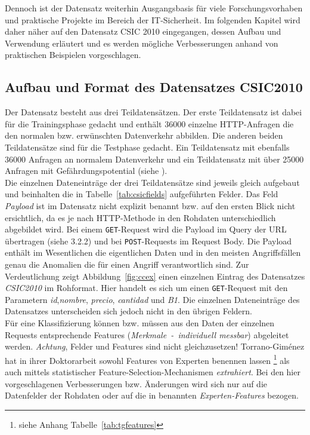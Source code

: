 Dennoch ist der Datensatz weiterhin Ausgangsbasis für viele Forschungsvorhaben und praktische Projekte im Bereich der IT-Sicherheit. Im folgenden Kapitel wird daher näher auf den Datensatz CSIC 2010 eingegangen, dessen Aufbau und Verwendung erläutert und es werden mögliche Verbesserungen anhand von praktischen Beispielen vorgeschlagen.
%

\subsection{Aufbau und Format des Datensatzes CSIC2010}
\label{sec:aufbauformat}

Der Datensatz besteht aus drei Teildatensätzen. Der erste Teildatensatz ist dabei für die Trainingsphase gedacht und enthält 36000 einzelne HTTP-Anfragen die den normalen bzw. erwünschten Datenverkehr abbilden. Die anderen beiden Teildatensätze sind für die Testphase gedacht. Ein Teildatensatz mit ebenfalls 36000 Anfragen an normalem Datenverkehr und ein Teildatensatz mit über 25000 Anfragen mit Gefährdungspotential (siehe \cite{csic2010}).\\

Die einzelnen Dateneinträge der drei Teildatensätze sind jeweils gleich aufgebaut und beinhalten die in Tabelle~\ref{tab:csicfields} aufgeführten Felder. Das Feld \emph{Payload} ist im Datensatz nicht explizit benannt bzw. auf den ersten Blick nicht ersichtlich, da es je nach HTTP-Methode in den Rohdaten unterschiedlich abgebildet wird. Bei einem \verb=GET=-Request wird die Payload im Query der URL übertragen (siehe \cite{rfc2626} 3.2.2) und bei \verb=POST=-Requests im Request Body. Die Payload enthält im Wesentlichen die eigentlichen Daten und in den meisten Angriffsfällen genau die Anomalien die für einen Angriff verantwortlich sind. Zur Verdeutlichung zeigt Abbildung~\ref{fig:ccex} einen einzelnen Eintrag des Datensatzes \emph{CSIC2010} im Rohformat. Hier handelt es sich um einen \verb=GET=-Request mit den Parametern \emph{id},\emph{nombre}, \emph{precio}, \emph{cantidad} und \emph{B1}. Die einzelnen Dateneinträge des Datensatzes unterscheiden sich jedoch nicht in den übrigen Feldern.\\

Für eine Klassifizierung können bzw. müssen aus den Daten der einzelnen Requests entsprechende Features (\emph{Merkmale~-~individuell messbar}) abgeleitet werden. \emph{Achtung}, Felder und Features sind nicht gleichzusetzen! Torrano-Giménez hat in ihrer Doktorarbeit sowohl Features von Experten benennen lassen \footnote{siehe Anhang Tabelle~\ref{tab:tgfeatures}} als auch mittels statistischer Feature-Selection-Mechanismen \emph{extrahiert}. Bei den hier vorgeschlagenen Verbesserungen bzw. Änderungen wird sich nur auf die Datenfelder der Rohdaten oder auf die in \cite{Giménez2015} benannten \emph{Experten-Features} bezogen. 


